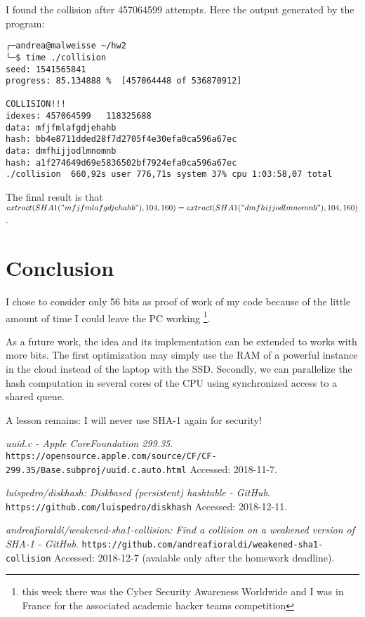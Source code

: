 \documentclass[11pt]{article}
\begin{document}
I found the collision after 457064599 attempts. Here the output generated by the program:

\begin{verbatim}
╭─andrea@malweisse ~/hw2  
╰─$ time ./collision                     
seed: 1541565841
progress: 85.134888 %  [457064448 of 536870912]

COLLISION!!!
idexes: 457064599   118325688
data: mfjfmlafgdjehahb
hash: bb4e8711dded28f7d2705f4e30efa0ca596a67ec
data: dmfhijjodlmnomnb
hash: a1f274649d69e5836502bf7924efa0ca596a67ec
./collision  660,92s user 776,71s system 37% cpu 1:03:58,07 total
\end{verbatim}

The final result is that $extract(SHA1("mfjfmlafgdjehahb"), 104, 160) = extract(SHA1("dmfhijjodlmnomnb"), 104, 160)$.

\section{Conclusion}

I chose to consider only 56 bits as proof of work of my code because of the little amount of time I could leave the PC working \footnote{this week there was the Cyber Security Awareness Worldwide and I was in France for the associated academic hacker teams competition}.

As a future work, the idea and its implementation can be extended to works with more bits. The first optimization may simply use the RAM of a powerful instance in the cloud instead of the laptop with the SSD. Secondly, we can parallelize the hash computation in several cores of the CPU using synchronized access to a shared queue.

A lesson remains: I will never use SHA-1 again for security!

\vfill

\begin{thebibliography}{99}

{\em uuid.c - Apple CoreFoundation 299.35}.
  \verb|https://opensource.apple.com/source/CF/CF-299.35/Base.subproj/uuid.c.auto.html|
  \newblock Accessed: 2018-11-7.

{\em luispedro/diskhash: Diskbased (persistent) hashtable - GitHub}.
  \verb|https://github.com/luispedro/diskhash|
  \newblock Accessed: 2018-12-11.

{\em andreafioraldi/weakened-sha1-collision: Find a collision on a weakened version of SHA-1 - GitHub}.
  \verb|https://github.com/andreafioraldi/weakened-sha1-collision|
  \newblock Accessed: 2018-12-7 (avaiable only after the homework deadline).

\end{thebibliography}
\end{document}
